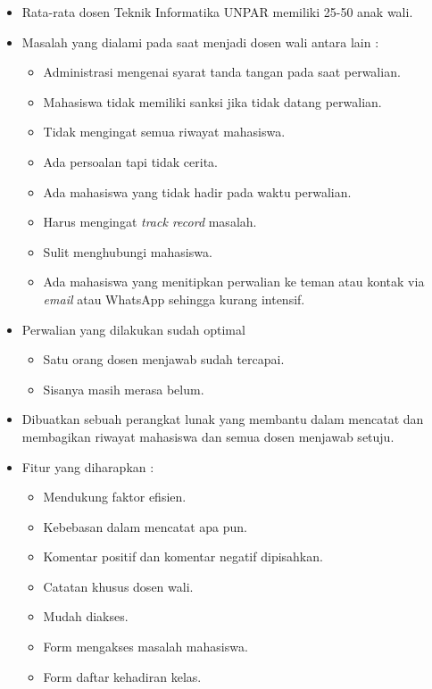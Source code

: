 \begin{itemize}
\item Rata-rata dosen Teknik Informatika UNPAR memiliki 25-50 anak wali.
\item Masalah yang dialami pada saat menjadi dosen wali antara lain :
    \begin{itemize}
    \item Administrasi mengenai syarat tanda tangan pada saat perwalian.
    \item Mahasiswa tidak memiliki sanksi jika tidak datang perwalian.
    \item Tidak mengingat semua riwayat mahasiswa.
    \item Ada persoalan tapi tidak cerita.
    \item Ada mahasiswa yang tidak hadir pada waktu perwalian.
    \item Harus mengingat {\it track record} masalah.
    \item Sulit menghubungi mahasiswa.
    \item Ada mahasiswa yang menitipkan perwalian ke teman atau kontak via {\it email} atau WhatsApp sehingga kurang intensif.
    \end{itemize}
\item Perwalian yang dilakukan sudah optimal
    \begin{itemize}
    \item Satu orang dosen menjawab sudah tercapai.
    \item Sisanya masih merasa belum.
    \end{itemize}
\item Dibuatkan sebuah perangkat lunak yang membantu dalam mencatat dan membagikan riwayat mahasiswa dan semua dosen menjawab setuju.
\item Fitur yang diharapkan :
    \begin{itemize}
    \item Mendukung faktor efisien.
    \item Kebebasan dalam mencatat apa pun.
    \item Komentar positif dan komentar negatif dipisahkan.
    \item Catatan khusus dosen wali.
    \item Mudah diakses.
    \item Form mengakses masalah mahasiswa.
    \item Form daftar kehadiran kelas.
    \end{itemize}
\end{itemize}

